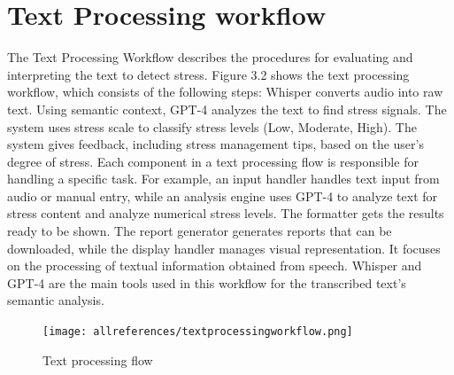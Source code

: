 \documentclass[Arial,12pt,openright,twoside]{book}
\begin{document}
\section{Text Processing workflow}
The Text Processing Workflow describes the procedures for evaluating and interpreting the text to detect stress. Figure 3.2 shows the text processing workflow, which consists of the following steps: Whisper converts audio into raw text. Using semantic context, GPT-4 analyzes the text to find stress signals. The system uses stress scale to classify stress levels (Low, Moderate, High). The system gives feedback, including stress management tips, based on the user's degree of stress. Each component in a text processing flow is responsible for handling a specific task. For example, an input handler handles text input from audio or manual entry, while an analysis engine uses GPT-4 to analyze text for stress content and analyze numerical stress levels. The formatter gets the results ready to be shown. The report generator generates reports that can be downloaded, while the display handler manages visual representation. It focuses on the processing of textual information obtained from speech. Whisper and GPT-4 are the main tools used in this workflow for the transcribed text's semantic analysis.
\begin{figure}[!htbp]
\centering
\texttt{[image: allreferences/textprocessingworkflow.png]}
\caption{Text processing flow}
\label{fig:text flow}
\end{figure}
\end{document}
